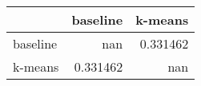 \begin{tabular}{lrr}
\toprule
          &   baseline &    k-means \\
\midrule
 baseline & nan        &   0.331462 \\
 k-means  &   0.331462 & nan        \\
\bottomrule
\end{tabular}